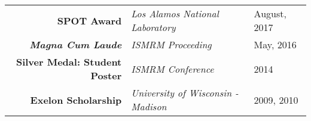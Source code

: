 
\begin{minipage}{\textwidth}
\begin{center}
\begin{tabular}{rll}
	\textbf{SPOT Award} & \textit{Los Alamos National Laboratory} & August, 2017 \\ 
	\textit{\textbf{Magna Cum Laude}} & \textit{ISMRM Proceeding} & May, 2016 \\
	\textbf{Silver Medal: Student Poster} & \textit{ISMRM Conference} & 2014 \\
	\textbf{Exelon Scholarship} & \textit{University of Wisconsin - Madison} & 2009, 2010\\
\end{tabular}
\end{center}
\end{minipage}
